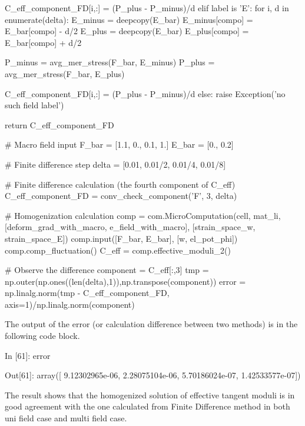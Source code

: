 \documentclass[10pt,a4paper]{scrreprt}
\begin{document}
\begin{python}
            C_eff_component_FD[i,:] = (P_plus - P_minus)/d
    elif label is 'E':
        for i, d in enumerate(delta):
            E_minus = deepcopy(E_bar)
            E_minus[compo] = E_bar[compo] - d/2
            E_plus = deepcopy(E_bar)
            E_plus[compo] = E_bar[compo] + d/2

            P_minus = avg_mer_stress(F_bar, E_minus)
            P_plus  = avg_mer_stress(F_bar, E_plus)
            
            C_eff_component_FD[i,:] = (P_plus - P_minus)/d
    else:
        raise Exception('no such field label')
    
    return C_eff_component_FD 

# Macro field input
F_bar = [1.1, 0., 0.1, 1.]
E_bar = [0., 0.2]

# Finite difference step
delta = [0.01, 0.01/2, 0.01/4, 0.01/8]

# Finite difference calculation (the fourth component of C_eff)
C_eff_component_FD = conv_check_component('F', 3, delta)

# Homogenization calculation 
comp = com.MicroComputation(cell, mat_li,
                        [deform_grad_with_macro, e_field_with_macro],
                        [strain_space_w, strain_space_E])
comp.input([F_bar, E_bar], [w, el_pot_phi])
comp.comp_fluctuation()
C_eff = comp.effective_moduli_2()

# Observe the difference
component = C_eff[:,3]
tmp = np.outer(np.ones((len(delta),1)),np.transpose(component))
error = np.linalg.norm(tmp - C_eff_component_FD, axis=1)/np.linalg.norm(component)
\end{python}

The output of the error (or calculation difference between two methods) is in the following code block.
\begin{python}
In [61]: error

Out[61]:
array([  9.12302965e-06,   2.28075104e-06,   5.70186024e-07,
         1.42533577e-07])
\end{python}

The result shows that the homogenized solution of effective tangent moduli is in good agreement with the one calculated from Finite Difference method in both uni field case and multi field case. 
\end{document}
